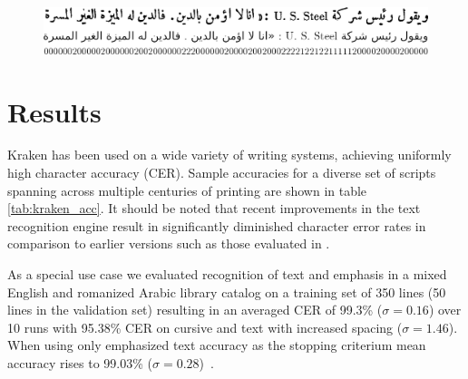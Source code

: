 \begin{figure}[h]
        \includegraphics[width=\linewidth]{transcription.png}
        \centering
        \label{fig:kraken_transcription}
\end{figure}

\section{Results}

Kraken has been used on a wide variety of writing systems, achieving uniformly
high character accuracy (CER). Sample accuracies for a diverse set of scripts
spanning across multiple centuries of printing are shown in table
\ref{tab:kraken_acc}. It should be noted that recent improvements in the text
recognition engine result in significantly diminished character error rates in
comparison to earlier versions such as those evaluated in
\cite{kiessling2017important}.

As a special use case we evaluated recognition of text and emphasis in a mixed
English and romanized Arabic library catalog on a training set of 350 lines (50
lines in the validation set) resulting in an averaged CER  of 99.3\%
($\sigma=0.16$) over 10 runs with 95.38\% CER on cursive and text with
increased spacing ($\sigma=1.46$). When using only emphasized text accuracy as
the stopping criterium mean accuracy rises to 99.03\%
($\sigma=0.28$)~\cite{kiessling2018read}.
